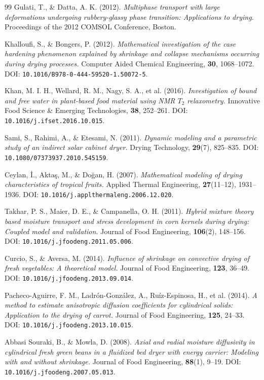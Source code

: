 \begin{thebibliography}{99}
 Gulati, T., \& Datta, A. K. (2012).
\emph{Multiphase transport with large deformations undergoing rubbery-glassy
phase transition: Applications to drying.}
Proceedings of the 2012 COMSOL Conference, Boston.

 Khalloufi, S., \& Bongers, P. (2012).
\emph{Mathematical investigation of the case hardening phenomenon explained by
shrinkage and collapse mechanisms occurring during drying processes.}
Computer Aided Chemical Engineering, \textbf{30}, 1068--1072.
DOI: \texttt{10.1016/B978-0-444-59520-1.50072-5}.

 Khan, M. I. H., Wellard, R. M., Nagy, S. A., et al. (2016).
\emph{Investigation of bound and free water in plant-based food material using
NMR $T_2$ relaxometry.}
Innovative Food Science \& Emerging Technologies, \textbf{38}, 252--261.
DOI: \texttt{10.1016/j.ifset.2016.10.015}.

 Sami, S., Rahimi, A., \& Etesami, N. (2011).
\emph{Dynamic modeling and a parametric study of an indirect solar cabinet
dryer.} Drying Technology, \textbf{29}(7), 825--835.
DOI: \texttt{10.1080/07373937.2010.545159}.

 Ceylan, \.I., Akta\c{s}, M., \& Do\u{g}an, H. (2007).
\emph{Mathematical modeling of drying characteristics of tropical fruits.}
Applied Thermal Engineering, \textbf{27}(11--12), 1931--1936.
DOI: \texttt{10.1016/j.applthermaleng.2006.12.020}.

 Takhar, P. S., Maier, D. E., \& Campanella, O. H. (2011).
\emph{Hybrid mixture theory based moisture transport and stress development in
corn kernels during drying: Coupled model and validation.}
Journal of Food Engineering, \textbf{106}(2), 148--156.
DOI: \texttt{10.1016/j.jfoodeng.2011.05.006}.

 Curcio, S., \& Aversa, M. (2014).
\emph{Influence of shrinkage on convective drying of fresh vegetables:
A theoretical model.} Journal of Food Engineering, \textbf{123}, 36--49.
DOI: \texttt{10.1016/j.jfoodeng.2013.09.014}.

 Pacheco-Aguirre, F. M., Ladr\'on-Gonz\'alez, A.,
Ru\'iz-Espinosa, H., et al. (2014).
\emph{A method to estimate anisotropic diffusion coefficients for cylindrical
solids: Application to the drying of carrot.}
Journal of Food Engineering, \textbf{125}, 24--33.
DOI: \texttt{10.1016/j.jfoodeng.2013.10.015}.

 Abbasi Souraki, B., \& Mowla, D. (2008).
\emph{Axial and radial moisture diffusivity in cylindrical fresh green beans in
a fluidized bed dryer with energy carrier: Modeling with and without shrinkage.}
Journal of Food Engineering, \textbf{88}(1), 9--19.
DOI: \texttt{10.1016/j.jfoodeng.2007.05.013}.


\end{thebibliography}
